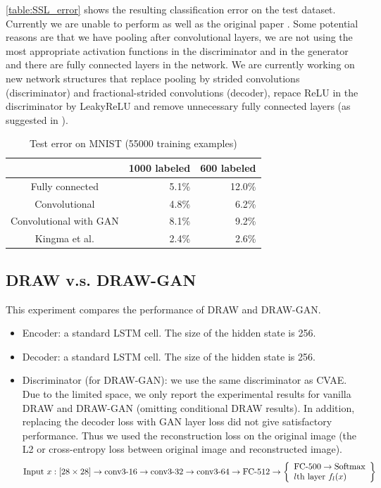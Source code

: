 \documentclass[10pt]{article}
\begin{document}
  \autoref{table:SSL_error} shows the resulting classification error on the test dataset. Currently we are unable to perform as well as the original paper \cite{DBLP:journals/corr/KingmaRMW14}. Some potential reasons are that we have pooling after convolutional layers, we are not using the most appropriate activation functions in the discriminator and in the generator and there are fully connected layers in the network. We are currently working on new network structures that replace pooling by strided convolutions (discriminator) and fractional-strided convolutions (decoder), repace ReLU in the discriminator by LeakyReLU and remove unnecessary fully connected layers (as suggested in \cite{alec2016dcgan}).

\begin{table}[!ht]
\centering
\begin{tabular}{c|r|r}
& 1000 labeled & 600 labeled\\ \hline
Fully connected &  5.1\% &  12.0\%\\
Convolutional &  4.8\% &  6.2\%\\
Convolutional with GAN &  8.1\% &  9.2\%\\
Kingma et al. \cite{DBLP:journals/corr/KingmaRMW14}
& 2.4\% & 2.6\%
\end{tabular}
\caption{Test error on MNIST (55000 training examples)}
\label{table:SSL_error}
\end{table}




\subsection{DRAW v.s. DRAW-GAN}
This experiment compares the performance of DRAW and DRAW-GAN.



\begin{itemize}

\item Encoder: a standard LSTM cell. The size of the hidden state is 256.

\item Decoder: a standard LSTM cell. The size of the hidden state is 256.


\item Discriminator (for DRAW-GAN): we use the same discriminator as CVAE. Due to the limited space, we only report the experimental results for vanilla DRAW and DRAW-GAN (omitting conditional DRAW results). In addition, replacing the decoder loss with GAN layer loss did not give satisfactory performance. Thus we used the reconstruction loss on the original image (the L2 or cross-entropy loss between original image and reconstructed image).
\[
\text{Input } x: [28\times 28] \to \text{conv3-16} \to \text{conv3-32} \to \text{conv3-64} \\
\to \text{FC-512} \to \left\{\begin{array}{lr}
        \text{FC-500}\to \text{Softmax}\\
        \text{$l$th layer $f_l(x)$}
        \end{array}\right\}
\]
\end{itemize}
\end{document}
